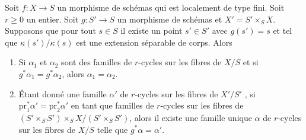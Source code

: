 \begin{lemma} 
\label{lemma-descend-family} 
Soit  $f : X \to S$  un morphisme de schémas qui est localement de type fini. 
Soit $r \geq 0$  un entier. Soit  $g : S' \to S$  un morphisme de 
schémas et  $X' = S' \times_S X$. Supposons que pour tout  $s \in S$  il 
existe un point  $s' \in S'$  avec $g(s') = s$  et tel que  
$\kappa(s')/\kappa(s)$  est une extension séparable de corps. Alors 
\begin{enumerate} 
\item Si  $\alpha_1$  et  $\alpha_2$  sont des familles de  $r$-cycles sur les fibres de  $X/S$
  et si  $g^*\alpha_1 = g^*\alpha_2$, alors  $\alpha_1 = \alpha_2$. 
\item Étant donné une famille  $\alpha'$  de  $r$-cycles sur les fibres de $X'/S'$ , si  
$\text{pr}_1^*\alpha' = \text{pr}_2^*\alpha'$  en tant que familles de  
$r$-cycles sur les fibres de  $(S' \times_S S') \times_S X / (S' \times_S S')$,
 alors il existe une famille unique  $\alpha$  de $r$-cycles sur les fibres de  $X/S$
  telle que  $g^*\alpha = \alpha'$. 
\end{enumerate} 
\end{lemma} 

